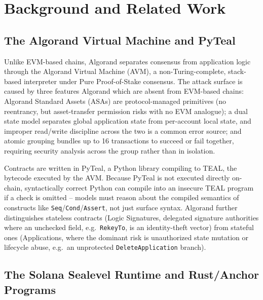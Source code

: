 \documentclass[lettersize,journal]{IEEEtran}
\begin{document}
\section{Background and Related Work}
\label{sec:background}

\subsection{The Algorand Virtual Machine and PyTeal}
\label{sec:avm}

Unlike EVM-based chains, Algorand separates consensus from application logic 
through the Algorand Virtual Machine (AVM), a non-Turing-complete, stack-based interpreter 
under Pure Proof-of-Stake consensus. The attack surface is caused by three features Algorand which
are absent from EVM-based chains:
Algorand Standard Assets (ASAs) are protocol-managed primitives (no reentrancy, 
but asset-transfer permission risks with no EVM analogue); a dual state model separates 
global application state from per-account local state, and improper read/write discipline 
across the two is a common error source; and atomic grouping bundles up to 16 transactions 
to succeed or fail together, requiring security analysis across the group rather than in isolation.

Contracts are written in PyTeal, a Python library compiling to TEAL, the bytecode 
executed by the AVM. Because PyTeal is not executed directly on-chain, syntactically correct 
Python can compile into an insecure TEAL program if a check is omitted -- models must 
reason about the compiled semantics of constructs like \texttt{Seq}/\texttt{Cond}/\texttt{Assert},
not
just surface syntax. Algorand further distinguishes stateless contracts (Logic Signatures, 
delegated signature authorities where an unchecked field, e.g.\ \texttt{RekeyTo}, is an 
identity-theft vector) from stateful ones (Applications, where the dominant risk is 
unauthorized state mutation or lifecycle abuse, e.g.\ an unprotected \texttt{DeleteApplication}
branch).

\subsection{The Solana Sealevel Runtime and Rust/Anchor Programs}
\label{sec:sealevel}
\end{document}
